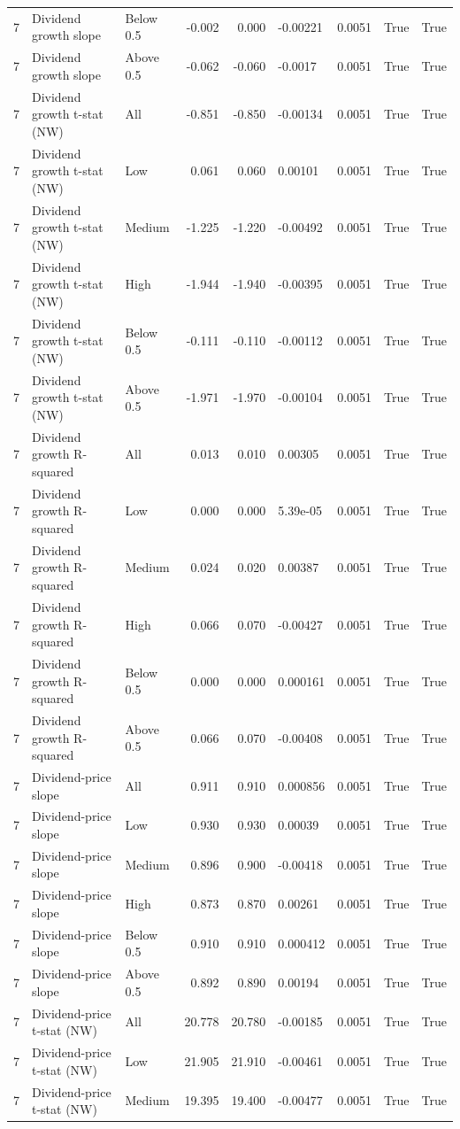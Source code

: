 \documentclass[10pt]{article}
\begin{document}
\begin{landscape}
\begin{longtable}{rllrrllrr}
7 & Dividend growth slope & Below 0.5 & -0.002 & 0.000 & -0.00221 & 0.0051 & True & True \\
7 & Dividend growth slope & Above 0.5 & -0.062 & -0.060 & -0.0017 & 0.0051 & True & True \\
7 & Dividend growth t-stat (NW) & All & -0.851 & -0.850 & -0.00134 & 0.0051 & True & True \\
7 & Dividend growth t-stat (NW) & Low & 0.061 & 0.060 & 0.00101 & 0.0051 & True & True \\
7 & Dividend growth t-stat (NW) & Medium & -1.225 & -1.220 & -0.00492 & 0.0051 & True & True \\
7 & Dividend growth t-stat (NW) & High & -1.944 & -1.940 & -0.00395 & 0.0051 & True & True \\
7 & Dividend growth t-stat (NW) & Below 0.5 & -0.111 & -0.110 & -0.00112 & 0.0051 & True & True \\
7 & Dividend growth t-stat (NW) & Above 0.5 & -1.971 & -1.970 & -0.00104 & 0.0051 & True & True \\
7 & Dividend growth R-squared & All & 0.013 & 0.010 & 0.00305 & 0.0051 & True & True \\
7 & Dividend growth R-squared & Low & 0.000 & 0.000 & 5.39e-05 & 0.0051 & True & True \\
7 & Dividend growth R-squared & Medium & 0.024 & 0.020 & 0.00387 & 0.0051 & True & True \\
7 & Dividend growth R-squared & High & 0.066 & 0.070 & -0.00427 & 0.0051 & True & True \\
7 & Dividend growth R-squared & Below 0.5 & 0.000 & 0.000 & 0.000161 & 0.0051 & True & True \\
7 & Dividend growth R-squared & Above 0.5 & 0.066 & 0.070 & -0.00408 & 0.0051 & True & True \\
7 & Dividend-price slope & All & 0.911 & 0.910 & 0.000856 & 0.0051 & True & True \\
7 & Dividend-price slope & Low & 0.930 & 0.930 & 0.00039 & 0.0051 & True & True \\
7 & Dividend-price slope & Medium & 0.896 & 0.900 & -0.00418 & 0.0051 & True & True \\
7 & Dividend-price slope & High & 0.873 & 0.870 & 0.00261 & 0.0051 & True & True \\
7 & Dividend-price slope & Below 0.5 & 0.910 & 0.910 & 0.000412 & 0.0051 & True & True \\
7 & Dividend-price slope & Above 0.5 & 0.892 & 0.890 & 0.00194 & 0.0051 & True & True \\
7 & Dividend-price t-stat (NW) & All & 20.778 & 20.780 & -0.00185 & 0.0051 & True & True \\
7 & Dividend-price t-stat (NW) & Low & 21.905 & 21.910 & -0.00461 & 0.0051 & True & True \\
7 & Dividend-price t-stat (NW) & Medium & 19.395 & 19.400 & -0.00477 & 0.0051 & True & True \\
\end{longtable}


\end{landscape}
\end{document}
